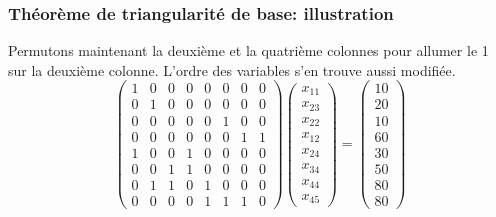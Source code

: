 \documentclass[usepdftitle=false]{beamer}
\begin{document}
\begin{frame}
\frametitle{Théorème de triangularité de base: illustration}

Permutons maintenant la deuxième et la quatrième colonnes pour allumer le 1 sur la deuxième colonne. L'ordre des variables s'en trouve aussi modifiée.
\[
\begin{pmatrix}
 1 & 0 & 0 & 0 & 0 & 0 & 0 & 0 \\
 0 & 1 & 0 & 0 & 0 & 0 & 0 & 0 \\
 0 & 0 & 0 & 0 & 0 & 1 & 0 & 0 \\
 0 & 0 & 0 & 0 & 0 & 0 & 1 & 1 \\
 1 & 0 & 0 & 1 & 0 & 0 & 0 & 0 \\
 0 & 0 & 1 & 1 & 0 & 0 & 0 & 0 \\
 0 & 1 & 1 & 0 & 1 & 0 & 0 & 0 \\
 0 & 0 & 0 & 0 & 1 & 1 & 1 & 0
\end{pmatrix}
\begin{pmatrix}
x_{11} \\
x_{23} \\
x_{22} \\
x_{12} \\
x_{24} \\
x_{34} \\
x_{44} \\
x_{45}
\end{pmatrix}
=
\begin{pmatrix}
10 \\
20 \\
10 \\
60 \\
30 \\
50 \\
80 \\
80
\end{pmatrix}
\]

\end{frame}
\end{document}
